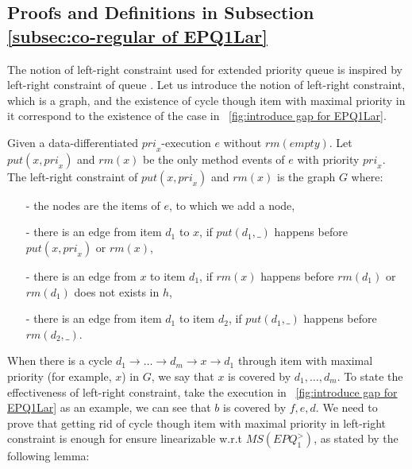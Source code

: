 \subsection{Proofs and Definitions in Subsection \ref{subsec:co-regular of EPQ1Lar}}
\label{sec:appendix proof and definition in section co-regular of EPQ1Lar}


The notion of left-right constraint used for extended priority queue is inspired by left-right constraint of queue \cite{Bouajjani:2015}. Let us introduce the notion of left-right constraint, which is a graph, and the existence of cycle though item with maximal priority in it correspond to the existence of the case in \figurename~\ref{fig:introduce gap for EPQ1Lar}.



\begin{definition}\label{def:left-right constraint for matched put and rm operations}
Given a data-differentiated $\textit{pri}_x$-execution $e$ without $\textit{rm}(\textit{empty})$. Let $\textit{put}(x,\textit{pri}_x)$ and $\textit{rm}(x)$ be the only  method events of $e$ with priority $\textit{pri}_x$. The left-right constraint of $\textit{put}(x,\textit{pri}_x)$ and $\textit{rm}(x)$ is the graph $G$ where:

\begin{itemize}
\setlength{\itemsep}{0.5pt}
\item[-] the nodes are the items of $e$, to which we add a node,

\item[-] there is an edge from item $d_1$ to $x$, if $\textit{put}(d_1,\_)$ happens before $\textit{put}(x,\textit{pri}_x)$ or $\textit{rm}(x)$,

\item[-] there is an edge from $x$ to item $d_1$, if $\textit{rm}(x)$ happens before $\textit{rm}(d_1)$ or $\textit{rm}(d_1)$ does not exists in $h$,

\item[-] there is an edge from item $d_1$ to item $d_2$, if $\textit{put}(d_1,\_)$ happens before $\textit{rm}(d_2,\_)$.
\end{itemize}
\end{definition}

When there is a cycle $d_1 \rightarrow \ldots \rightarrow d_m \rightarrow x \rightarrow d_1$ through item with maximal priority (for example, $x$) in $G$, we say that $x$ is covered by $d_1,\ldots,d_m$. To state the effectiveness of left-right constraint, take the execution in \figurename~\ref{fig:introduce gap for EPQ1Lar} as an example, we can see that $b$ is covered by $f,e,d$. We need to prove that getting rid of cycle though item with maximal priority in left-right constraint is enough for ensure linearizable w.r.t $\textit{MS}(\textit{EPQ}_1^{>})$, as stated by the following lemma:


